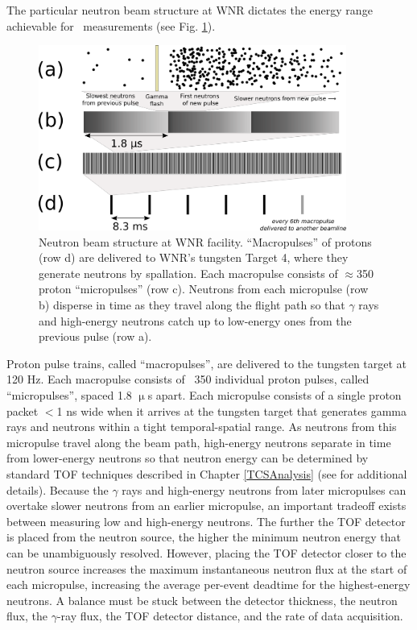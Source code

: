 The particular neutron beam structure at WNR dictates the energy range
achievable for \tot\ measurements (see Fig. \ref{BeamStructure}).
\begin{figure}[tb]
    \centering
    \includegraphics[width=0.9\textwidth]{figures/beamStructure.png}
    \caption[Pulsed structure of the neutron beam at the WNR facility]
    {
        Neutron beam structure at WNR facility.
        ``Macropulses'' of protons (row d) are delivered to
        WNR's tungsten Target 4, where they generate neutrons by spallation.
        Each macropulse consists of
        $\approx$350 proton ``micropulses'' (row c). Neutrons
        from each micropulse (row b) disperse in
        time as they travel along the flight path so that $\gamma$ rays and high-energy 
        neutrons catch up to low-energy ones from the previous pulse (row a).
    }
    \label{BeamStructure}
\end{figure}
Proton pulse trains, called ``macropulses'', are delivered to the tungsten target at 120 Hz.
Each macropulse consists of ~350 individual proton pulses, called
``micropulses'', spaced 1.8 
$\upmu$s apart. Each micropulse consists of a single proton packet $<$1 ns wide when it 
arrives at the tungsten target that generates gamma rays and neutrons within a tight
temporal-spatial range. As neutrons from this micropulse travel along the beam path, 
high-energy neutrons separate in time from lower-energy neutrons so that neutron
energy can be determined by standard TOF techniques described in Chapter
\ref{TCSAnalysis} (see \cite{Moore1980} for additional details).
Because the $\gamma$ rays and high-energy neutrons from later micropulses can
overtake slower neutrons from an earlier micropulse, an important tradeoff
exists between measuring low and high-energy neutrons. The further the TOF
detector is placed from the neutron source, the higher the minimum neutron energy that can be 
unambiguously resolved. However, placing the TOF detector closer to the neutron source
increases the maximum instantaneous neutron flux at the start of each
micropulse, increasing the average per-event deadtime for the highest-energy
neutrons. A balance must be stuck between the detector thickness, the neutron
flux, the $\gamma$-ray flux, the TOF detector distance, and the rate
of data acquisition.

